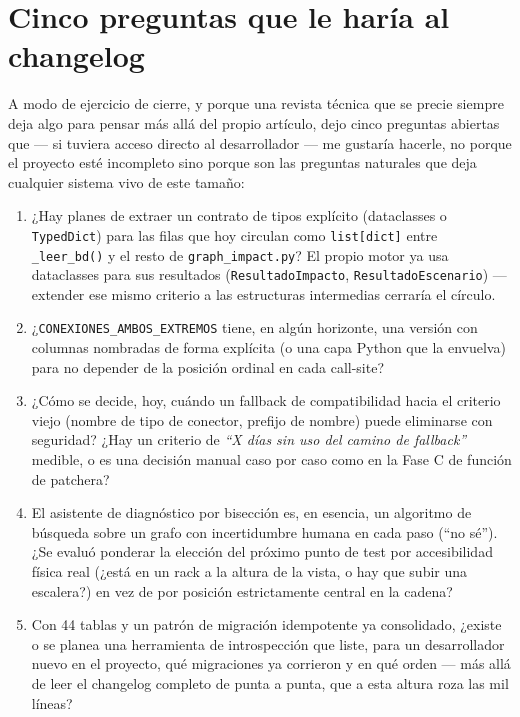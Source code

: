 \documentclass[11pt,twocolumn]{article}
\begin{document}
\section{Cinco preguntas que le haría al changelog}

A modo de ejercicio de cierre, y porque una revista técnica que se precie siempre deja algo para pensar más allá del propio artículo, dejo cinco preguntas abiertas que --- si tuviera acceso directo al desarrollador --- me gustaría hacerle, no porque el proyecto esté incompleto sino porque son las preguntas naturales que deja cualquier sistema vivo de este tamaño:

\begin{enumerate}[leftmargin=1.3em,itemsep=3pt]
\item ¿Hay planes de extraer un contrato de tipos explícito (dataclasses o \texttt{TypedDict}) para las filas que hoy circulan como \texttt{list[dict]} entre \texttt{\_leer\_bd()} y el resto de \texttt{graph\_impact.py}? El propio motor ya usa dataclasses para sus resultados (\texttt{ResultadoImpacto}, \texttt{ResultadoEscenario}) --- extender ese mismo criterio a las estructuras intermedias cerraría el círculo.
\item ¿\texttt{CONEXIONES\_AMBOS\_EXTREMOS} tiene, en algún horizonte, una versión con columnas nombradas de forma explícita (o una capa Python que la envuelva) para no depender de la posición ordinal en cada call-site?
\item ¿Cómo se decide, hoy, cuándo un fallback de compatibilidad hacia el criterio viejo (nombre de tipo de conector, prefijo de nombre) puede eliminarse con seguridad? ¿Hay un criterio de \emph{``X días sin uso del camino de fallback''} medible, o es una decisión manual caso por caso como en la Fase C de función de patchera?
\item El asistente de diagnóstico por bisección es, en esencia, un algoritmo de búsqueda sobre un grafo con incertidumbre humana en cada paso (``no sé''). ¿Se evaluó ponderar la elección del próximo punto de test por accesibilidad física real (¿está en un rack a la altura de la vista, o hay que subir una escalera?) en vez de por posición estrictamente central en la cadena?
\item Con 44 tablas y un patrón de migración idempotente ya consolidado, ¿existe o se planea una herramienta de introspección que liste, para un desarrollador nuevo en el proyecto, qué migraciones ya corrieron y en qué orden --- más allá de leer el changelog completo de punta a punta, que a esta altura roza las mil líneas?
\end{enumerate}
\end{document}
